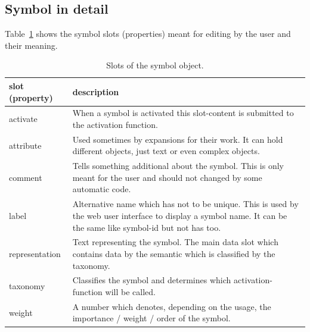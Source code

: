 \documentclass[a4paper, 12pt, openany]{scrbook}
\begin{document}
\subsection{Symbol in detail}
Table~\ref{tab:symbol} shows the symbol slots (properties) meant for editing by the user and their meaning.
\begin{table}[htbp]
\centering
\begin{tabular}{|p{4cm}|p{12cm}|}
  \hline
  \textbf{slot (property)} & \textbf{description} \\
  \hline
  activate & When a symbol is activated this slot-content is submitted to the activation function. \\
  \hline
  attribute & Used sometimes by expansions for their work. It can hold different objects, just text or even complex objects. \\
  \hline
  comment & Tells something additional about the symbol. This is only meant for the user and should not changed by some automatic code. \\
  \hline
  label & Alternative name which has not to be unique. This is used by the web user interface to display a symbol name. It can be the same like symbol-id but not has too. \\
  \hline
  representation & Text representing the symbol. The main data slot which contains data by the semantic which is classified by the taxonomy. \\
  \hline
  taxonomy & Classifies the symbol and determines which activation-function will be called. \\
  \hline
  weight & A number which denotes, depending on the usage, the importance / weight / order of the symbol. \\
  \hline
\end{tabular}
\caption{Slots of the symbol object.}
\label{tab:symbol}
\end{table}
\end{document}
